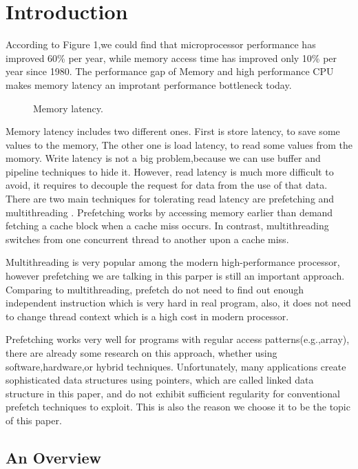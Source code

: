 \documentclass{acm_proc_article-sp}
\begin{document}
\section{Introduction}

According to Figure 1,we could find that  microprocessor
performance has improved 60\% per year, while memory access time has improved
only 10\% per year since 1980.\cite{Yang:2002:PMH:646349.690705} The
performance gap of  Memory and high performance CPU makes memory
latency an improtant performance bottleneck today. 
\begin{figure}
\centering
{}
\caption{Memory latency.}
\end{figure}

Memory latency includes two different ones. First is store latency, to
save some values to the memory, The other one is load 
latency, to read some values from the momory. Write latency
is not a big problem,because we can use buffer and pipeline techniques to hide
it. However, read latency is much more difficult to avoid, it requires
to decouple the request for data from the use of that data. There are two
main techniques for tolerating read latency are
prefetching  and multithreading
\cite{Luk:1996:CPR:248208.237190}. Prefetching works by accessing
memory earlier than demand 
fetching a cache block when a cache miss occurs. In contrast,
multithreading  switches from one concurrent
thread to another upon a cache miss. 

Multithreading is very popular among the modern high-performance
processor, however prefetching we are talking in this parper is still
an important approach. Comparing to multithreading, prefetch do not
need to find out enough independent instruction which is very hard in
real program, also, it does not need to change thread context which is a high
cost in modern processor. 

Prefetching works very well for programs with regular access
patterns(e.g.,array), there are already some research on this
approach, whether using software,hardware,or hybrid techniques. 
Unfortunately, many applications create sophisticated data
structures using pointers, which are called linked data structure in
this paper, and do not exhibit sufficient regularity
for conventional prefetch techniques to exploit. This is also the
reason we choose it to be the topic of this paper. 
\cite{Vanderwiel:2000:DPM:358923.358939}
\subsection{An Overview}
\end{document}
